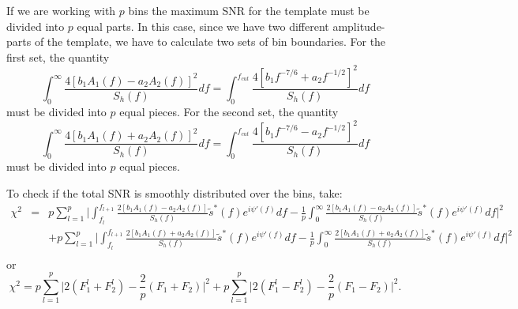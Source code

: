 If we are working with $p$ bins the maximum SNR for the template must be 
divided into $p$ equal parts. In this case, since we have two different 
amplitude-parts of the template, we have to calculate two sets of bin
boundaries.
For the first set, the quantity
\begin{displaymath}
\int_0^{\infty} \frac{4 [b_1 A_1(f) - a_2 A_2(f) ]^2 }{S_h(f)} df =
\int_0^{f_{cut}} \frac{4 [b_1 f^{-7/6} + a_2 f^{-1/2}]^2}{S_h(f)} df
\end{displaymath}
must be divided into $p$ equal pieces.
For the second set, the quantity
\begin{displaymath}
\int_0^{\infty} \frac{4 [b_1 A_1(f) + a_2 A_2(f) ]^2 }{S_h(f)} df =
\int_0^{f_{cut}} \frac{4 [b_1 f^{-7/6} - a_2 f^{-1/2}]^2}{S_h(f)} df
\end{displaymath} 
must be divided into $p$ equal pieces.

To check if the total SNR is smoothly distributed over the bins,
take:
\begin{eqnarray}
\chi^2 &=& p \sum_{l=1}^p  \Big | \int_{f_l}^{f_{l+1}} \frac{2 [b_1
     A_1(f) - a_2 A_2(f)]}{S_h(f)} \tilde{s}^{\ast}(f) e^{i \psi'(f)} df
     - \frac{1}{p} \int_{0}^{\infty} \frac{2 [b_1A_1(f) - a_2 A_2(f)]}
{S_h(f)} \tilde{s}^{\ast}(f) e^{i \psi'(f)} df \Big |^2 \\
	 &&+ p\sum_{l=1}^p\Big |\int_{f_l}^{f_{l+1}} \frac{2 [b_1 A_1(f) + a_2
     A_2(f)]}{S_h(f)}\tilde{s}^{\ast}(f)e^{i \psi'(f)} df-\frac{1}{p} 
     \int_{0}^{\infty} \frac{2[b_1 A_1(f) + a_2 A_2(f)]}{S_h(f)}
\tilde{s}^{\ast}(f)e^{i \psi'(f)} df\Big |^2 \\
\end{eqnarray}
or
\begin{equation}
\chi^2 =  p \sum_{l=1}^p  \Big |2 (F_1^l+F_2^l) 
     - \frac{2}{p} (F_1+F_2) \Big |^2 + p \sum_{l=1}^p  \Big |2 (F_1^l-F_2^l)
     - \frac{2}{p} (F_1-F_2) \Big |^2.
\end{equation}

%
%

